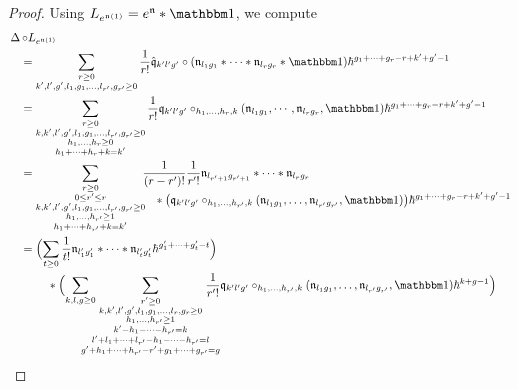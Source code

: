 \documentclass[\MainFolder/Text.tex]{subfiles}
\begin{document}
\begin{proof}
Using $L_{e^{\PMC(1)}} = e^{\PMC}\Star \Id$, we compute
\begin{align*}
&\BVOp \circ L_{e^{\PMC(1)}} \\
&\quad = \sum_{\substack{r\ge 0 \\ k', l', g', l_1, g_1, \dotsc, l_{r'}, g_{r'} \ge 0}}  \frac{1}{r!} \hat{\OPQ}_{k'l'g'}\circ(\PMC_{l_1 g_1} \Star \dotsb \Star \PMC_{l_r g_r}\Star \Id)\hbar^{g_1 + \dotsb + g_r - r + k' + g' - 1} \\
&\quad = \sum_{\substack{r\ge 0 \\ k, k', l', g', l_1, g_1, \dotsc, l_{r'}, g_{r'} \ge 0 \\ h_1, \dotsc, h_r \ge 0 \\ h_1 + \dotsb + h_r + k = k'}}  \frac{1}{r!} \OPQ_{k'l'g'}\circ_{h_1,\dotsc,h_r,k}(\PMC_{l_1 g_1}, \dotsb, \PMC_{l_r g_r}, \Id)\hbar^{g_1 + \dotsb + g_r - r + k' + g' - 1} \\
&\quad = \sum_{\substack{
r\ge 0 \\ 0 \le r' \le r \\ k, k', l', g', l_1, g_1, \dotsc, l_{r'}, g_{r'} \ge 0 \\ h_1, \dotsc, h_{r'} \ge 1 \\ h_1 + \dotsb + h_{r'} + k = k'}}\hspace{-.2cm}\begin{multlined}[t]\frac{1}{(r-r')!}\frac{1}{r'!} \PMC_{l_{r'+1} g_{r'+1}}\Star \dotsb \Star \PMC_{l_r g_r} \\ \Star \bigl(\OPQ_{k'l'g'}\circ_{h_1,\dotsc,h_{r'},k}(\PMC_{l_1 g_1},\dotsc,\PMC_{l_{r'} g_{r'}},\Id)\bigr) \hbar^{g_1 + \dotsb + g_r - r + k' + g' - 1}\end{multlined}\\
&\quad=\begin{multlined}[t]
\Bigl(\sum_{t\ge 0} \frac{1}{t!} \PMC_{l_1' g_1'}\Star\dotsb\Star\PMC_{l_{t}'g_t'} \hbar^{g_{1}' + \dotsb + g_t' - t}\Bigr) \\
\Star \Bigl(\sum_{k,l,g\ge 0}\hspace{-.5cm}\sum_{\substack{r'\ge 0\\
k,k',l',g',l_1,g_1,\dotsc,l_r,g_r\ge 0\\
h_1,\dotsc, h_{r'}\ge 1 \\
k' - h_1 - \dotsb - h_{r'} =  k\\
l' + l_1 + \dotsb + l_{r'} - h_1 - \dotsb - h_{r'} = l\\
g' + h_1 + \dotsb + h_{r'} - r' + g_1 + \dotsb + g_{r'} = g
}} \hspace{-.5cm} \frac{1}{r'!}\OPQ_{k'l'g'}\circ_{h_1,\dotsc,h_{r'},k}(\PMC_{l_1 g_1},\dotsc,\PMC_{l_{r'} g_{r'}},\Id) \hbar^{k + g -1}\Bigr)

\end{multlined}
\end{align*}
\end{proof}
\end{document}
